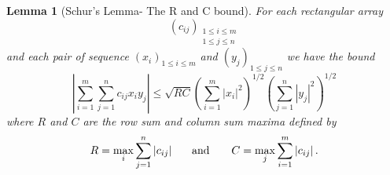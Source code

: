 \documentclass{article}
\newtheorem{lemma}[theorem]{Lemma}
\begin{document}
\begin{lemma}[Schur's Lemma- The R and C bound]
For each rectangular array 
\begin{equation*}
\left( c_{ij}\right) _{\substack{ 1\leq i\leq m  \\ 1\leq j\leq n}}
\end{equation*}%
and each pair of sequence $\left( x_{i}\right) _{1\leq i\leq m}$ and $\left(
y_{j}\right) _{1\leq j\leq n}$ we have the bound 
\begin{equation*}
\left| \sum_{i=1}^{m}\sum_{j=1}^{n}c_{ij}x_{i}y_{j}\right| \leq \sqrt{RC}%
\left( \sum_{i=1}^{m}\left| x_{i}\right| ^{2}\right) ^{1/2}\left(
\sum_{j=1}^{n}\left| y_{j}\right| ^{2}\right) ^{1/2}
\end{equation*}%
where $R$ and $C$ are the row sum and column sum maxima defined by 
\begin{equation*}
R=\max\limits_{i}\sum_{j=1}^{n}\left| c_{ij}\right| \text{ \ \ \ \ and \ \ \
\ \ }C=\max\limits_{j}\sum_{i=1}^{m}\left| c_{ij}\right| .
\end{equation*}
\end{lemma}
\end{document}
